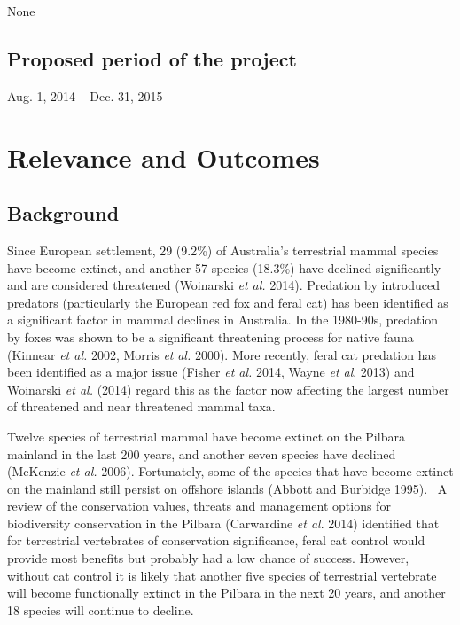 \documentclass[version=last,
    paper=a4,                               %
    10pt,                                   %
    dvipsnames,
    oneside,                              %
    headings=openany,                       %
    open=any,
    BCOR=7mm,                               %
    DIV=15,     %
]{scrbook}
\begin{document}
None


\subsection*{Proposed period of the project}
Aug. 1, 2014 -- Dec. 31, 2015



\section*{Relevance and Outcomes}


\subsection*{Background}

Since European settlement, 29 (9.2\%) of Australia's terrestrial mammal
species have become extinct, and another 57 species (18.3\%) have
declined significantly and are considered threatened (Woinarski \emph{et
al.} 2014). Predation by introduced predators (particularly the European
red fox and feral cat) has been identified as a significant factor in
mammal declines in Australia. In the 1980-90s, predation by foxes was
shown to be a significant threatening process for native fauna (Kinnear
\emph{et al.} 2002, Morris \emph{et} \emph{al.} 2000). More recently,
feral cat predation has been identified as a major issue (Fisher
\emph{et al.} 2014, Wayne \emph{et al}. 2013) and Woinarski \emph{et
al.} (2014) regard this as the factor now affecting the largest number
of threatened and near threatened mammal taxa.

Twelve species of terrestrial mammal have become extinct on the Pilbara
mainland in the last 200 years, and another seven species have declined
(McKenzie \emph{et al.} 2006). Fortunately, some of the species that
have become extinct on the mainland still persist on offshore islands
(Abbott and Burbidge 1995). ~A review of the conservation values,
threats and management options for biodiversity conservation in the
Pilbara (Carwardine \emph{et al}. 2014) identified that for terrestrial
vertebrates of conservation significance, feral cat control would
provide most benefits but probably had a low chance of success. However,
without cat control it is likely that another five species of
terrestrial vertebrate will become functionally extinct in the Pilbara
in the next 20 years, and another 18 species will continue to decline.
\end{document}
